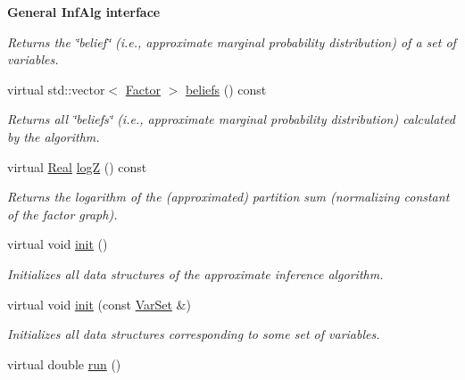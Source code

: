 \begin{Indent}{\bf General InfAlg interface}
\begin{CompactItemize}
\begin{CompactList}\small\item\em Returns the \char`\"{}belief\char`\"{} (i.e., approximate marginal probability distribution) of a set of variables. \item\end{CompactList}\item 
\hypertarget{classdai_1_1JTree_3c16a15fe017649fec4d63455fda6843}{
virtual std::vector$<$ \hyperlink{classdai_1_1TFactor}{Factor} $>$ \hyperlink{classdai_1_1JTree_3c16a15fe017649fec4d63455fda6843}{beliefs} () const }
\label{classdai_1_1JTree_3c16a15fe017649fec4d63455fda6843}

\begin{CompactList}\small\item\em Returns all \char`\"{}beliefs\char`\"{} (i.e., approximate marginal probability distribution) calculated by the algorithm. \item\end{CompactList}\item 
\hypertarget{classdai_1_1JTree_d2e2c9ff0327014da4c41d211bfd57c5}{
virtual \hyperlink{namespacedai_e7d0472fdc89a8635825d01940e91cbf}{Real} \hyperlink{classdai_1_1JTree_d2e2c9ff0327014da4c41d211bfd57c5}{logZ} () const }
\label{classdai_1_1JTree_d2e2c9ff0327014da4c41d211bfd57c5}

\begin{CompactList}\small\item\em Returns the logarithm of the (approximated) partition sum (normalizing constant of the factor graph). \item\end{CompactList}\item 
virtual void \hyperlink{classdai_1_1JTree_cbb2df1dc4e64097a46fc4cb1394e76f}{init} ()
\begin{CompactList}\small\item\em Initializes all data structures of the approximate inference algorithm. \item\end{CompactList}\item 
virtual void \hyperlink{classdai_1_1JTree_365c52b5f264c844ac5c010026719350}{init} (const \hyperlink{classdai_1_1VarSet}{VarSet} \&)
\begin{CompactList}\small\item\em Initializes all data structures corresponding to some set of variables. \item\end{CompactList}\item 
\hypertarget{classdai_1_1JTree_b0cd2ba167212e4c8c8d241b985d3db6}{
virtual double \hyperlink{classdai_1_1JTree_b0cd2ba167212e4c8c8d241b985d3db6}{run} ()}
\label{classdai_1_1JTree_b0cd2ba167212e4c8c8d241b985d3db6}


\end{CompactItemize}
\end{Indent}
